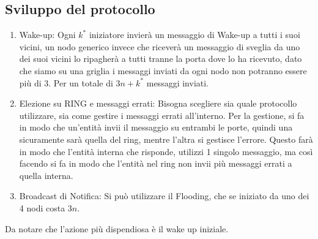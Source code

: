 \subsection{Sviluppo del protocollo}
\begin{enumerate}
    \item Wake-up: Ogni $k^*$ iniziatore invierà un messaggio di Wake-up a tutti i
          suoi vicini, un nodo generico invece che riceverà un messaggio di sveglia da
          uno dei suoi vicini lo ripagherà a tutti tranne la porta dove lo ha ricevuto,
          dato che siamo su una griglia i messaggi inviati da ogni nodo non potranno
          essere più di 3. Per un totale di $3n +k^*$ messaggi inviati.
    \item Elezione su RING e messaggi errati: Bisogna scegliere sia quale
          protocollo utilizzare, sia come gestire i messaggi errati all'interno. Per la
          gestione, si fa in modo che un'entità invii il messaggio su entrambi le porte,
          quindi una sicuramente sarà quella del ring, mentre l'altra si gestisce
          l'errore. Questo farà in modo che l'entità interna che risponde, utilizzi 1
          singolo messaggio, ma così facendo si fa in modo che l'entità nel ring non
          invii più messaggi errati a quella interna.
    \item Broadcast di Notifica: Si può utilizzare il Flooding, che se iniziato da
          uno dei 4 nodi costa $3n$.
\end{enumerate}
Da notare che l'azione più dispendiosa è il wake up iniziale.

